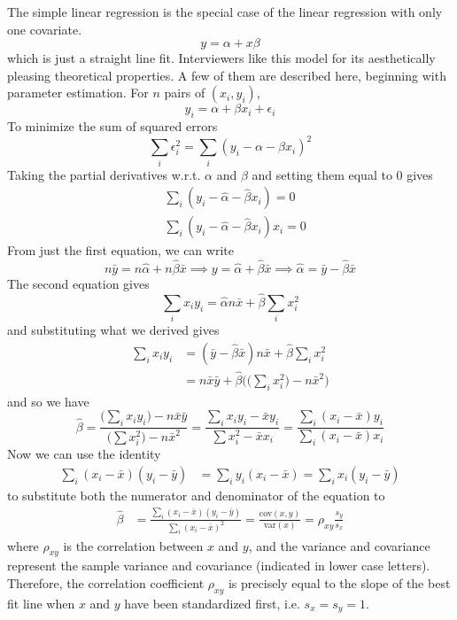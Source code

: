 \documentclass{article}
\theoremstyle{definition}
\begin{document}
  The simple linear regression is the special case of the linear regression with only one covariate. 
  \[y = \alpha + x \beta\]
  which is just a straight line fit. Interviewers like this model for its aesthetically pleasing theoretical properties. A few of them are described here, beginning with parameter estimation. For $n$ pairs of $(x_i, y_i)$, 
  \[y_i = \alpha + \beta x_i + \epsilon_i\]
  To minimize the sum of squared errors 
  \[\sum_{i} \epsilon_i^2 = \sum_{i} (y_i - \alpha - \beta x_i)^2\]
  Taking the partial derivatives w.r.t. $\alpha$ and $\beta$ and setting them equal to $0$ gives 
  \begin{align*}
      &\sum_i (y_i - \hat{\alpha} - \hat{\beta} x_i) = 0 \\
      &\sum_i (y_i - \hat{\alpha} - \hat{\beta} x_i) x_i = 0
  \end{align*}
  From just the first equation, we can write 
  \[n \bar{y} = n \hat{\alpha} + n \hat{\beta} \bar{x} \implies y = \hat{\alpha} + \hat{\beta} \bar{x} \implies \hat{\alpha}  = \bar{y} - \hat{\beta} \bar{x} \]
  The second equation gives 
  \[\sum_{i} x_i y_i = \hat{\alpha} n \bar{x} + \hat{\beta} \sum_{i} x_i^2\]
  and substituting what we derived gives 
  \begin{align*}
      \sum_{i} x_i y_i & = (\bar{y} - \hat{\beta} \bar{x}) n \bar{x} + \hat{\beta} \sum_i x_i^2 \\
      & = n \bar{x} \bar{y} + \hat{\beta} \bigg( \Big(\sum_i x_i^2 \Big) - n \bar{x}^2 \bigg)
  \end{align*}
  and so we have 
  \[\hat{\beta} = \frac{ \big( \sum_i x_i y_i \big) - n \bar{x}\bar{y}}{\big( \sum x_i^2 \big) - n \bar{x}^2} = \frac{ \sum_i x_i y_i - \bar{x} y_i}{\sum x_i^2 - \bar{x} x_i} = \frac{ \sum_i (x_i - \bar{x}) y_i}{\sum_i (x_i - \bar{x}) x_i}\]
  Now we can use the identity
  \begin{align*}
      \sum_{i} (x_i - \bar{x}) (y_i - \bar{y}) & = \sum_i y_i (x_i - \bar{x}) = \sum_i x_i (y_i - \bar{y}) 
  \end{align*}
  to substitute both the numerator and denominator of the equation to 
  \begin{align*}
      \hat{\beta} & = \frac{\sum_i (x_i - \bar{x}) (y_i - \bar{y})}{\sum_i (x_i - \bar{x})^2} = \frac{\mathrm{cov}(x, y)}{\mathrm{var}(x)} = \rho_{xy} \frac{s_y}{s_x}
  \end{align*}
  where $\rho_{xy}$ is the correlation between $x$ and $y$, and the variance and covariance represent the sample variance and covariance (indicated in lower case letters). Therefore, the correlation coefficient $\rho_{xy}$ is precisely equal to the slope of the best fit line when $x$ and $y$ have been standardized first, i.e. $s_x = s_y = 1$. 
\end{document}
